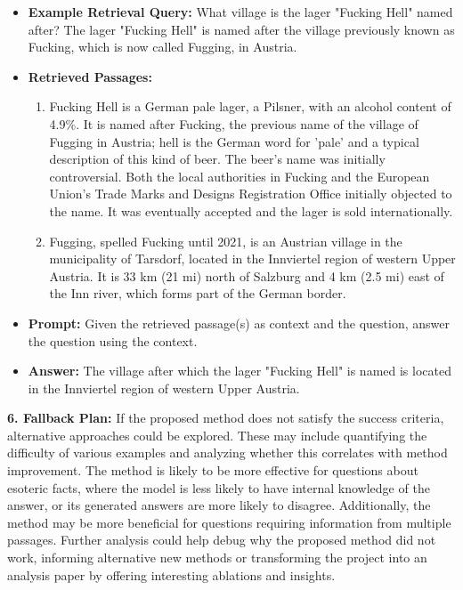 \begin{tcolorbox}[colback=blue!5!white,colframe=blue!75!black,title=\textbf{LLM Directed Retrieval Querying for Improving Factuality (Part 2)}]
\begin{itemize}
\begin{itemize}
\begin{itemize}
                \item \textbf{Example Retrieval Query:} What village is the lager "Fucking Hell" named after? The lager "Fucking Hell" is named after the village previously known as Fucking, which is now called Fugging, in Austria.
                \item \textbf{Retrieved Passages:}
                \begin{enumerate}
                    \item Fucking Hell is a German pale lager, a Pilsner, with an alcohol content of 4.9\%. It is named after Fucking, the previous name of the village of Fugging in Austria; hell is the German word for 'pale' and a typical description of this kind of beer. The beer's name was initially controversial. Both the local authorities in Fucking and the European Union's Trade Marks and Designs Registration Office initially objected to the name. It was eventually accepted and the lager is sold internationally.
                    \item Fugging, spelled Fucking until 2021, is an Austrian village in the municipality of Tarsdorf, located in the Innviertel region of western Upper Austria. It is 33 km (21 mi) north of Salzburg and 4 km (2.5 mi) east of the Inn river, which forms part of the German border.
                \end{enumerate}
                \item \textbf{Prompt:} Given the retrieved passage(s) as context and the question, answer the question using the context.
                \item \textbf{Answer:} The village after which the lager "Fucking Hell" is named is located in the Innviertel region of western Upper Austria.
            \end{itemize}
        \end{itemize}
    \end{itemize}

    \textbf{6. Fallback Plan:} If the proposed method does not satisfy the success criteria, alternative approaches could be explored. These may include quantifying the difficulty of various examples and analyzing whether this correlates with method improvement. The method is likely to be more effective for questions about esoteric facts, where the model is less likely to have internal knowledge of the answer, or its generated answers are more likely to disagree. Additionally, the method may be more beneficial for questions requiring information from multiple passages. Further analysis could help debug why the proposed method did not work, informing alternative new methods or transforming the project into an analysis paper by offering interesting ablations and insights.

\end{tcolorbox}

